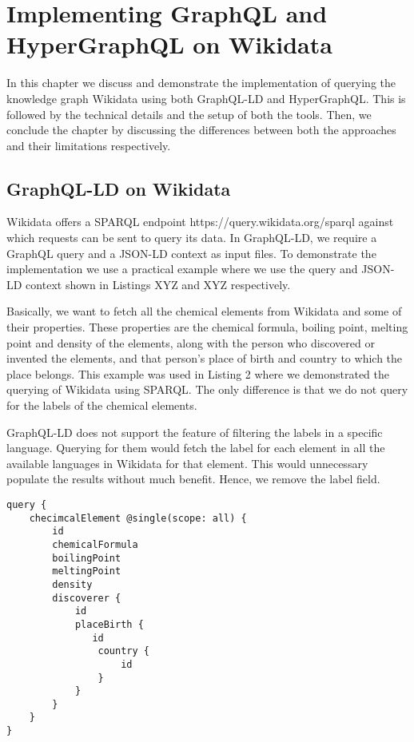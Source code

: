 \chapter{Implementing GraphQL and HyperGraphQL on Wikidata}
\label{ch:4}
In this chapter we discuss and demonstrate the implementation of querying the knowledge graph Wikidata using both GraphQL-LD and HyperGraphQL. This is followed by the technical details and the setup of both the tools. Then, we conclude the chapter by discussing the differences between both the approaches and their limitations respectively.

\section{GraphQL-LD on Wikidata}

Wikidata offers a SPARQL endpoint https://query.wikidata.org/sparql against which requests can be sent to query its data. In GraphQL-LD, we require a GraphQL query and a JSON-LD context as input files. To demonstrate the implementation we use a practical example where we use the query and JSON-LD context shown in Listings XYZ and XYZ respectively. 

Basically, we want to fetch all the chemical elements from Wikidata and some of their properties. These properties are the chemical formula, boiling point, melting point and density of the elements, along with the person who discovered or invented the elements, and that person’s place of birth and country to which the place belongs. This example was used in Listing 2 where we demonstrated the querying of Wikidata using SPARQL. The only difference is that we do not query for the labels of the chemical elements.

GraphQL-LD does not support the feature of filtering the labels in a specific language. Querying for them would fetch the label for each element in all the available languages in Wikidata for that element. This would unnecessary populate the results without much benefit. Hence, we remove the label field.

\begin{minipage}{\linewidth}
\begin{lstlisting}[label=listing:listing17, caption={Query}]
query {
    checimcalElement @single(scope: all) {
        id 
        chemicalFormula
        boilingPoint
        meltingPoint
        density
        discoverer {
            id
            placeBirth {
               id
                country {
					id
				}
            }
        }
    }
}
\end{lstlisting}
\end{minipage}

